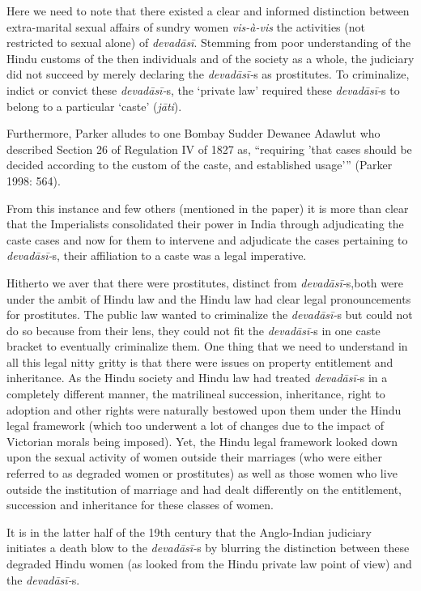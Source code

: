 Here we need to note that there existed a clear and informed distinction between extra-marital sexual affairs of sundry women \textit{vis-à-vis} the activities (not restricted to sexual alone) of \textit{devadāsī}. Stemming from poor understanding of the Hindu customs of the then individuals and of the society as a whole, the judiciary did not succeed by merely declaring the \textit{devadāsī-}s as prostitutes. To criminalize, indict or convict these \textit{devadāsī-}s, the ‘private law’ required these \textit{devadāsī-}s to belong to a particular ‘caste’ (\textit{jāti}).

Furthermore, Parker alludes to one Bombay Sudder Dewanee Adawlut who described Section 26 of Regulation IV of 1827 as, “requiring 'that cases should be decided according to the custom of the caste, and established usage’” (Parker 1998: 564).

From this instance and few others (mentioned in the paper) it is more than clear that the Imperialists consolidated their power in India through adjudicating the caste cases and now for them to intervene and adjudicate the cases pertaining to \textit{devadāsī-}s, their affiliation to a caste was a legal imperative.

Hitherto we aver that there were prostitutes, distinct from \textit{devadāsī-}s,\break both were under the ambit of Hindu law and the Hindu law had clear legal pronouncements for prostitutes. The public law wanted to criminalize the \textit{devadāsī-}s but could not do so because from their lens, they could not fit the \textit{devadāsī-}s in one caste bracket to eventually criminalize them. One thing that we need to understand in all this legal nitty gritty is that there were issues on property entitlement and inheritance. As the Hindu society and Hindu law had treated \textit{devadāsī-}s in a completely different manner, the matrilineal succession, inheritance, right to adoption and other rights were naturally bestowed upon them under the Hindu legal framework (which too underwent a lot of changes due to the impact of Victorian morals being imposed). Yet, the Hindu legal framework looked down upon the sexual activity of women outside their marriages (who were either referred to as degraded women or prostitutes) as well as those women who live outside the institution of marriage and had dealt differently on the entitlement, succession and inheritance for these classes of women.

It is in the latter half of the 19th century that the Anglo-Indian judiciary initiates a death blow to the \textit{devadāsī-}s by blurring the distinction between these degraded Hindu women (as looked from the Hindu private law point of view) and the \textit{devadāsī-}s.


